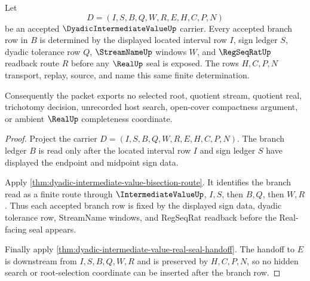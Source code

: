 \begin{theorem}
\label{thm:dyadic-intermediate-value-finite-branch-determinacy}
Let
$$
D=(I,S,B,Q,W,R,E,H,C,P,N)
$$
be an accepted $\DyadicIntermediateValueUp$ carrier. Every accepted branch row in $B$ is determined by the displayed located interval row $I$, sign ledger $S$, dyadic tolerance row $Q$, $\StreamNameUp$ windows $W$, and $\RegSeqRatUp$ readback route $R$ before any $\RealUp$ seal is exposed. The rows $H,C,P,N$ transport, replay, source, and name this same finite determination.

Consequently the packet exports no selected root, quotient stream, quotient real, trichotomy decision, unrecorded host search, open-cover compactness argument, or ambient $\RealUp$ completeness coordinate.
\end{theorem}
\begin{proof}
Project the carrier $D=(I,S,B,Q,W,R,E,H,C,P,N)$. The branch ledger $B$ is read only after the located interval row $I$ and sign ledger $S$ have displayed the endpoint and midpoint sign data.

Apply \autoref{thm:dyadic-intermediate-value-bisection-route}. It identifies the branch read as a finite route through $\IntermediateValueUp$, $I,S$, then $B,Q$, then $W,R$. Thus each accepted branch row is fixed by the displayed sign data, dyadic tolerance row, StreamName windows, and RegSeqRat readback before the Real-facing seal appears.

Finally apply \autoref{thm:dyadic-intermediate-value-real-seal-handoff}. The handoff to $E$ is downstream from $I,S,B,Q,W,R$ and is preserved by $H,C,P,N$, so no hidden search or root-selection coordinate can be inserted after the branch row.
\end{proof}

